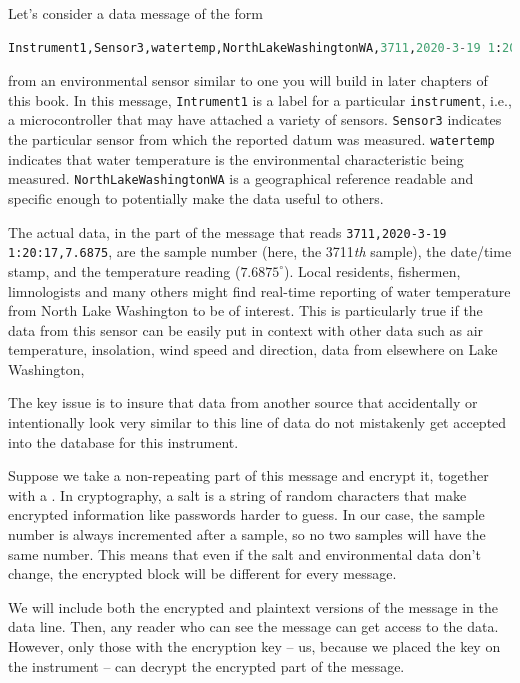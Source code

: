 Let's consider a data message of the form
\begin{lstlisting}[language=Python]
Instrument1,Sensor3,watertemp,NorthLakeWashingtonWA,3711,2020-3-19 1:20:17,7.6875
\end{lstlisting}
from an environmental sensor similar to one you will build in later chapters of this book.
In this message, \lstinline{Intrument1} is a label for a particular \texttt{instrument}, i.e., a microcontroller that may have attached a variety of sensors.
\lstinline{Sensor3} indicates the particular sensor from which the reported datum was measured.
\lstinline{watertemp} indicates that water temperature is the environmental characteristic being measured.
\lstinline{NorthLakeWashingtonWA} is a geographical reference readable and specific enough to potentially make the data useful to others.

The actual data, in the part of the message that reads \lstinline{3711,2020-3-19 1:20:17,7.6875}, are the sample number (here, the 3711\textit{th} sample), the date/time stamp, and the temperature reading ($7.6875^\circ$).
Local residents, fishermen, limnologists and many others might find real-time reporting of water temperature from North Lake Washington to be of interest.
This is particularly true if the data from this sensor can be easily put in context with other data such as air temperature, insolation, wind speed and direction, data from elsewhere on Lake Washington, \etc

The key issue is to insure that data from another source that accidentally or intentionally look very similar to this line of data do not mistakenly get accepted into the database for this instrument.

Suppose we take a non-repeating part of this message and encrypt it, together with a .
In cryptography, a salt is a string of random characters that make encrypted information like passwords harder to guess.
In our case, the sample number is always incremented after a sample, so no two samples will have the same number.
This means that even if the salt and environmental data don't change, the encrypted block will be different for every message.

We will include both the encrypted and plaintext versions of the message in the data line.
Then, any reader who can see the message can get access to the data.
However, only those with the encryption key -- us, because we placed the key on the instrument -- can decrypt the encrypted part of the message.

